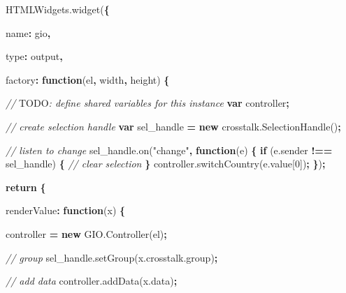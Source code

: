 \documentclass[
]{krantz}
\makeatletter
\newenvironment{Shaded}{\begin{snugshade}}{\end{snugshade}}
\newcommand{\AlertTok}[1]{\textcolor[rgb]{0.33,0.33,0.33}{#1}}
\newcommand{\AttributeTok}[1]{\textcolor[rgb]{0.61,0.61,0.61}{#1}}
\newcommand{\CommentTok}[1]{\textcolor[rgb]{0.37,0.37,0.37}{\textit{#1}}}
\newcommand{\ControlFlowTok}[1]{\textcolor[rgb]{0.27,0.27,0.27}{\textbf{#1}}}
\newcommand{\DataTypeTok}[1]{\textcolor[rgb]{0.27,0.27,0.27}{#1}}
\newcommand{\DecValTok}[1]{\textcolor[rgb]{0.06,0.06,0.06}{#1}}
\newcommand{\KeywordTok}[1]{\textcolor[rgb]{0.27,0.27,0.27}{\textbf{#1}}}
\newcommand{\NormalTok}[1]{#1}
\newcommand{\OperatorTok}[1]{\textcolor[rgb]{0.43,0.43,0.43}{\textbf{#1}}}
\newcommand{\StringTok}[1]{\textcolor[rgb]{0.5,0.5,0.5}{#1}}
\newcommand{\VariableTok}[1]{\textcolor[rgb]{0,0,0}{#1}}
\newenvironment{kframe}{%
\medskip{}
\setlength{\fboxsep}{.8em}
 \def\at@end@of@kframe{}%
 \ifinner\ifhmode%
  \def\at@end@of@kframe{\end{minipage}}%
  \begin{minipage}{\columnwidth}%
 \fi\fi%
 \def\FrameCommand##1{\hskip\@totalleftmargin \hskip-\fboxsep
 \colorbox{shadecolor}{##1}\hskip-\fboxsep
     \hskip-\linewidth \hskip-\@totalleftmargin \hskip\columnwidth}%
 \MakeFramed {\advance\hsize-\width
   \@totalleftmargin\z@ \linewidth\hsize
   \@setminipage}}%
 {\par\unskip\endMakeFramed%
 \at@end@of@kframe}
\renewenvironment{Shaded}{\begin{kframe}}{\end{kframe}}
\makeatother
\begin{document}
\begin{Shaded}
\begin{Highlighting}[]
\VariableTok{HTMLWidgets}\NormalTok{.}\AttributeTok{widget}\NormalTok{(}\OperatorTok{\{}

  \DataTypeTok{name}\OperatorTok{:} \StringTok{\textquotesingle{}gio\textquotesingle{}}\OperatorTok{,}

  \DataTypeTok{type}\OperatorTok{:} \StringTok{\textquotesingle{}output\textquotesingle{}}\OperatorTok{,}

  \DataTypeTok{factory}\OperatorTok{:} \KeywordTok{function}\NormalTok{(el}\OperatorTok{,}\NormalTok{ width}\OperatorTok{,}\NormalTok{ height) }\OperatorTok{\{}

    \CommentTok{// }\AlertTok{TODO}\CommentTok{: define shared variables for this instance}
    \KeywordTok{var}\NormalTok{ controller}\OperatorTok{;}

    \CommentTok{// create selection handle}
    \KeywordTok{var}\NormalTok{ sel\_handle }\OperatorTok{=} \KeywordTok{new} \VariableTok{crosstalk}\NormalTok{.}\AttributeTok{SelectionHandle}\NormalTok{()}\OperatorTok{;}

    \CommentTok{// listen to change}
    \VariableTok{sel\_handle}\NormalTok{.}\AttributeTok{on}\NormalTok{(}\StringTok{"change"}\OperatorTok{,} \KeywordTok{function}\NormalTok{(e) }\OperatorTok{\{}
      \ControlFlowTok{if}\NormalTok{ (}\VariableTok{e}\NormalTok{.}\AttributeTok{sender} \OperatorTok{!==}\NormalTok{ sel\_handle) }\OperatorTok{\{}
        \CommentTok{// clear selection}
      \OperatorTok{\}}
      \VariableTok{controller}\NormalTok{.}\AttributeTok{switchCountry}\NormalTok{(}\VariableTok{e}\NormalTok{.}\AttributeTok{value}\NormalTok{[}\DecValTok{0}\NormalTok{])}\OperatorTok{;}
    \OperatorTok{\}}\NormalTok{)}\OperatorTok{;}


    \ControlFlowTok{return} \OperatorTok{\{}

      \DataTypeTok{renderValue}\OperatorTok{:} \KeywordTok{function}\NormalTok{(x) }\OperatorTok{\{}

\NormalTok{        controller }\OperatorTok{=} \KeywordTok{new} \VariableTok{GIO}\NormalTok{.}\AttributeTok{Controller}\NormalTok{(el)}\OperatorTok{;}

        \CommentTok{// group}
        \VariableTok{sel\_handle}\NormalTok{.}\AttributeTok{setGroup}\NormalTok{(}\VariableTok{x}\NormalTok{.}\VariableTok{crosstalk}\NormalTok{.}\AttributeTok{group}\NormalTok{)}\OperatorTok{;}
        
        \CommentTok{// add data}
        \VariableTok{controller}\NormalTok{.}\AttributeTok{addData}\NormalTok{(}\VariableTok{x}\NormalTok{.}\AttributeTok{data}\NormalTok{)}\OperatorTok{;}


\end{Highlighting}
\end{Shaded}
\end{document}
